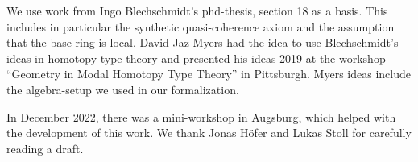 We use work from Ingo Blechschmidt's phd-thesis, section 18 as a basis.
This includes in particular the synthetic quasi-coherence axiom and the assumption that the base ring is local.
David Jaz Myers had the idea to use Blechschmidt's ideas in homotopy type theory
and presented his ideas 2019 at the workshop ``Geometry in Modal Homotopy Type Theory'' in Pittsburgh.
Myers ideas include the algebra-setup we used in our formalization.

In December 2022, there was a mini-workshop in Augsburg, which helped with the development of this work.
We thank Jonas Höfer and Lukas Stoll for carefully reading a draft.